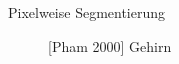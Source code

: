 \begin{frame}{Pixelweise Segmentierung}
\begin{figure}[ht]
\begin{minipage}[b]{0.45\linewidth}
            \caption{[Pham 2000] Gehirn}
            \label{fig:lung}
        \end{minipage}
    \end{figure}
\end{frame}
